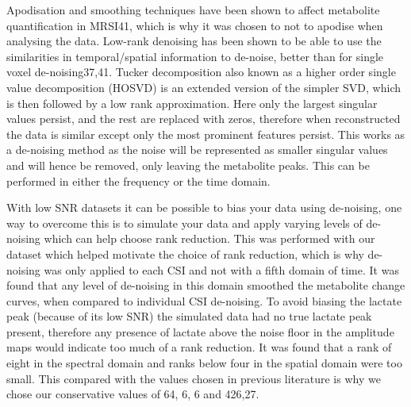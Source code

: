 \documentclass[class=article, crop=false]{standalone}
\begin{document}
Apodisation and smoothing techniques have been shown to affect metabolite quantification in MRSI41, which is why it was chosen to not to apodise when analysing the data. Low-rank denoising has been shown to be able to use the similarities in temporal/spatial information to de-noise, better than for single voxel de-noising37,41. Tucker decomposition also known as a higher order single value decomposition (HOSVD) is an extended version of the simpler SVD, which is then followed by a low rank approximation. Here only the largest singular values persist, and the rest are replaced with zeros, therefore when reconstructed the data is similar except only the most prominent features persist. This works as a de-noising method as the noise will be represented as smaller singular values and will hence be removed, only leaving the metabolite peaks. This can be performed in either the frequency or the time domain. 


With low SNR datasets it can be possible to bias your data using de-noising, one way to overcome this is to simulate your data and apply varying levels of de-noising which can help choose rank reduction. This was performed with our dataset which helped motivate the choice of rank reduction, which is why de-noising was only applied to each CSI and not with a fifth domain of time. It was found that any level of de-noising in this domain smoothed the metabolite change curves, when compared to individual CSI de-noising. To avoid biasing the lactate peak (because of its low SNR) the simulated data had no true lactate peak present, therefore any presence of lactate above the noise floor in the amplitude maps would indicate too much of a rank reduction. It was found that a rank of eight in the spectral domain and ranks below four in the spatial domain were too small. This compared with the values chosen in previous literature is why we chose our conservative values of 64, 6, 6 and 426,27. 
\end{document}
